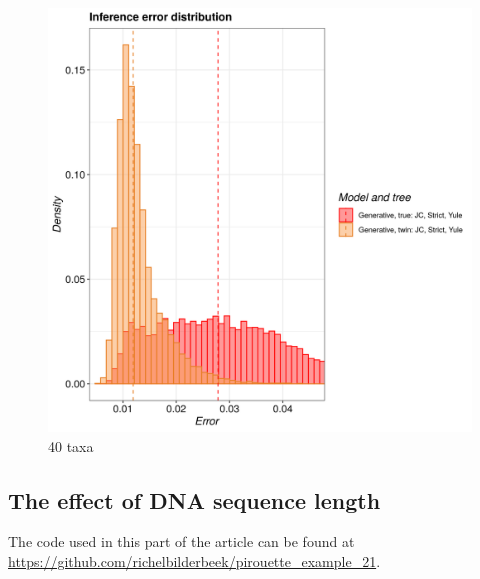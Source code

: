 \begin{figure}[H]
  \includegraphics[width=\textwidth]{pirouette_example_20/example_20_317/errors.png}
  \caption{40 taxa}
\end{figure}

\subsection{The effect of DNA sequence length}

The code used in this part of the article can be found at 
\url{https://github.com/richelbilderbeek/pirouette_example_21}.

